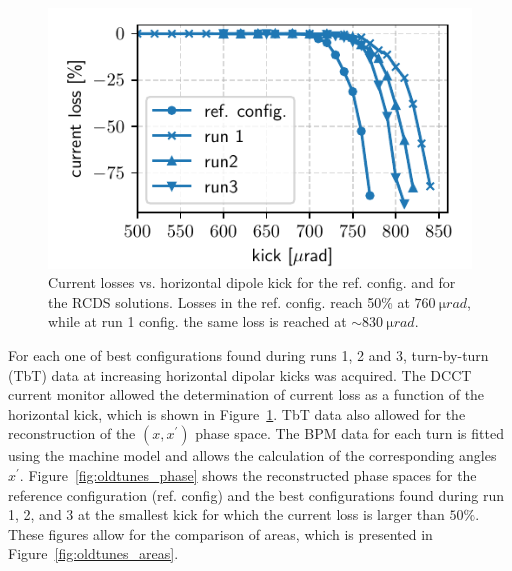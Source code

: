 \documentclass[a4paper,
               keeplastbox,   %
               ]{jacow}
\begin{document}
\begin{figure}[!h]
   \includegraphics[width=\columnwidth]{old_tunes_kick_resilience.pdf}
   \caption{Current losses vs. horizontal dipole kick for the ref. config. and for the RCDS solutions. Losses in the ref. config. reach 50\% at $760~\si{\micro rad}$, while at run 1 config. the same loss is reached at $\sim 830~\si{\micro rad}$.}
   \label{fig:loss_kicks}
\end{figure}
For each one of best configurations found during runs 1, 2 and 3, turn-by-turn (TbT) data at increasing horizontal dipolar kicks was acquired. The DCCT current monitor allowed the determination of current loss as a function of the horizontal kick, which is shown in Figure~\ref{fig:loss_kicks}. TbT data also allowed for the reconstruction of the $(x,x^\prime)$ phase space. The BPM data for each turn is fitted using the machine model and allows the calculation of the corresponding angles $x^\prime$. Figure~\ref{fig:oldtunes_phase} shows the reconstructed phase spaces for the reference configuration (ref. config) and the best configurations found during run 1, 2, and 3 at the smallest kick for which the current loss is larger than $50\%$. These figures allow for the comparison of areas, which is presented in Figure~\ref{fig:oldtunes_areas}.
\end{document}
